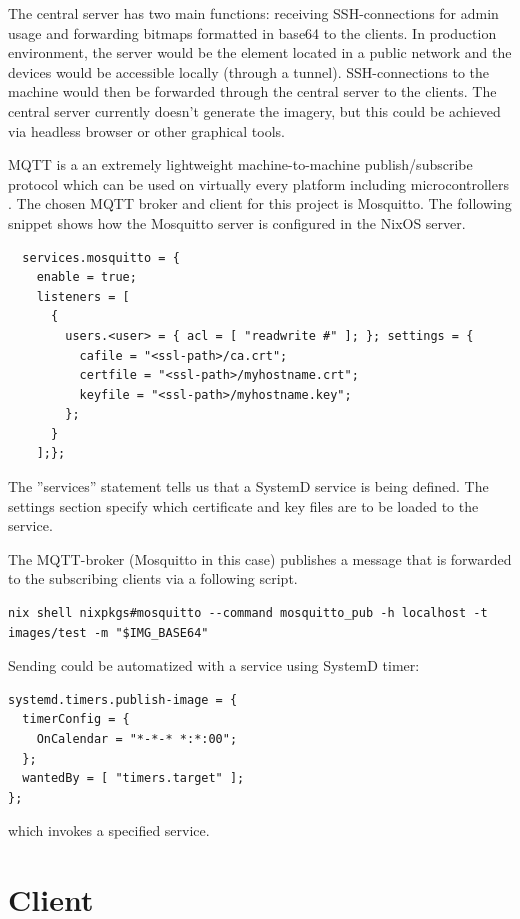The central server has two main functions: receiving SSH-connections
for admin usage and forwarding bitmaps formatted in base64 to the
clients. In production environment, the server would be the element
located in a public network and the devices would be accessible
locally (through a tunnel). SSH-connections to the machine would then
be forwarded through the central server to the clients. The central
server currently doesn't generate the imagery, but this could be
achieved via headless browser or other graphical tools.

MQTT is a an extremely lightweight machine-to-machine publish/subscribe
protocol which can be used on virtually every platform including
microcontrollers \cite{oasisopenMQTTVersion}. The chosen MQTT broker
and client for this project is Mosquitto. The following snippet shows
how the Mosquitto server is configured in the NixOS server.
\begin{lstlisting}
  services.mosquitto = {
    enable = true;
    listeners = [
      {
        users.<user> = { acl = [ "readwrite #" ]; }; settings = {
          cafile = "<ssl-path>/ca.crt";
          certfile = "<ssl-path>/myhostname.crt";
          keyfile = "<ssl-path>/myhostname.key";
        };
      }
    ];};
\end{lstlisting}

The ''services'' statement tells us that a SystemD service is being
defined. The settings section specify which certificate and key files
are to be loaded to the service.

The MQTT-broker (Mosquitto in this case) publishes a message that is
forwarded to the subscribing clients via a following script.

\begin{lstlisting}
nix shell nixpkgs#mosquitto --command mosquitto_pub -h localhost -t
images/test -m "$IMG_BASE64"
\end{lstlisting}

Sending could be automatized with a service using SystemD timer:
\begin{lstlisting}
systemd.timers.publish-image = {
  timerConfig = {
    OnCalendar = "*-*-* *:*:00";
  };
  wantedBy = [ "timers.target" ];
};
\end{lstlisting}

which invokes a specified service.

\section{Client}

